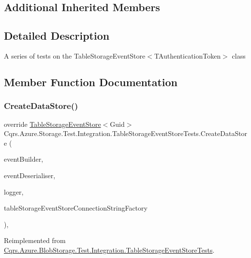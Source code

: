\subsection*{Additional Inherited Members}


\subsection{Detailed Description}
A series of tests on the Table\+Storage\+Event\+Store$<$\+T\+Authentication\+Token$>$ class 



\subsection{Member Function Documentation}
\mbox{\label{classCqrs_1_1Azure_1_1Storage_1_1Test_1_1Integration_1_1TableStorageEventStoreTests_a4e143d134a156e2ab0d044d7f6f15b5d}} 
\subsubsection{\texorpdfstring{Create\+Data\+Store()}{CreateDataStore()}}
{\footnotesize\ttfamily override \hyperlink{classCqrs_1_1Azure_1_1BlobStorage_1_1Events_1_1TableStorageEventStore}{Table\+Storage\+Event\+Store}$<$Guid$>$ Cqrs.\+Azure.\+Storage.\+Test.\+Integration.\+Table\+Storage\+Event\+Store\+Tests.\+Create\+Data\+Store (\begin{DoxyParamCaption}\item[{\hyperlink{interfaceCqrs_1_1Events_1_1IEventBuilder}{I\+Event\+Builder}$<$ Guid $>$}]{event\+Builder,  }\item[{\hyperlink{interfaceCqrs_1_1Events_1_1IEventDeserialiser}{I\+Event\+Deserialiser}$<$ Guid $>$}]{event\+Deserialiser,  }\item[{I\+Logger}]{logger,  }\item[{\hyperlink{interfaceCqrs_1_1Azure_1_1BlobStorage_1_1ITableStorageStoreConnectionStringFactory}{I\+Table\+Storage\+Store\+Connection\+String\+Factory}}]{table\+Storage\+Event\+Store\+Connection\+String\+Factory }\end{DoxyParamCaption})\hspace{0.3cm}{\ttfamily [protected]}, {\ttfamily [virtual]}}



Reimplemented from \hyperlink{classCqrs_1_1Azure_1_1BlobStorage_1_1Test_1_1Integration_1_1TableStorageEventStoreTests_aa2b40be10577126372049c14fd951e17}{Cqrs.\+Azure.\+Blob\+Storage.\+Test.\+Integration.\+Table\+Storage\+Event\+Store\+Tests}.

